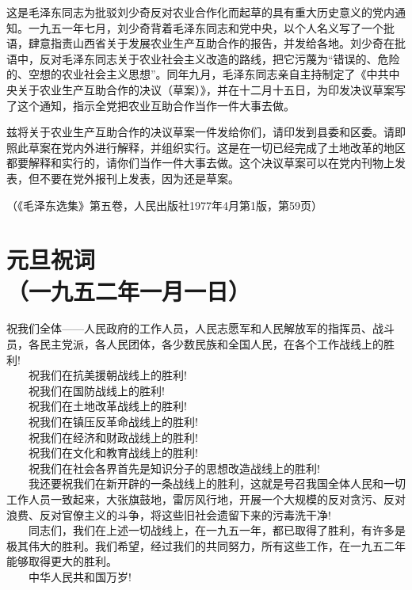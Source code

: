 \documentclass[cn,11pt,chinese]{elegantbook}
\def\myformat#1{\hfil\hfil #1}
\begin{document}
\begin{introduction}
这是毛泽东同志为批驳刘少奇反对农业合作化而起草的具有重大历史意义的党内通知。一九五一年七月，刘少奇背着毛泽东同志和党中央，以个人名义写了一个批语，肆意指责山西省关于发展农业生产互助合作的报告，并发给各地。刘少奇在批语中，反对毛泽东同志关于农业社会主义改造的路线，把它污蔑为“错误的、危险的、空想的农业社会主义思想”。同年九月，毛泽东同志亲自主持制定了《中共中央关于农业生产互助合作的决议（草案）》，并在十二月十五日，为印发决议草案写了这个通知，指示全党把农业互助合作当作一件大事去做。
\end{introduction}
兹将关于农业生产互助合作的决议草案一件发给你们，请印发到县委和区委。请即照此草案在党内外进行解释，并组织实行。这是在一切已经完成了土地改革的地区都要解释和实行的，请你们当作一件大事去做。这个决议草案可以在党内刊物上发表，但不要在党外报刊上发表，因为还是草案。
\begin{flushright}
（《毛泽东选集》第五卷，人民出版社1977年4月第1版，第59页）
\end{flushright}
\newpage\section*{\myformat{元旦祝词}\\\myformat{（一九五二年一月一日）}}
祝我们全体——人民政府的工作人员，人民志愿军和人民解放军的指挥员、战斗员，各民主党派，各人民团体，各少数民族和全国人民，在各个工作战线上的胜利!\\
　　祝我们在抗美援朝战线上的胜利!\\
　　祝我们在国防战线上的胜利!\\
　　祝我们在土地改革战线上的胜利!\\
　　祝我们在镇压反革命战线上的胜利!\\
　　祝我们在经济和财政战线上的胜利!\\
　　祝我们在文化和教育战线上的胜利!\\
　　祝我们在社会各界首先是知识分子的思想改造战线上的胜利!\\
　　我还要祝我们在新开辟的一条战线上的胜利，这就是号召我国全体人民和一切工作人员一致起来，大张旗鼓地，雷厉风行地，开展一个大规模的反对贪污、反对浪费、反对官僚主义的斗争，将这些旧社会遗留下来的污毒洗干净!\\
　　同志们，我们在上述一切战线上，在一九五一年，都已取得了胜利，有许多是极其伟大的胜利。我们希望，经过我们的共同努力，所有这些工作，在一九五二年能够取得更大的胜利。\\
　　中华人民共和国万岁!\\
\end{document}
